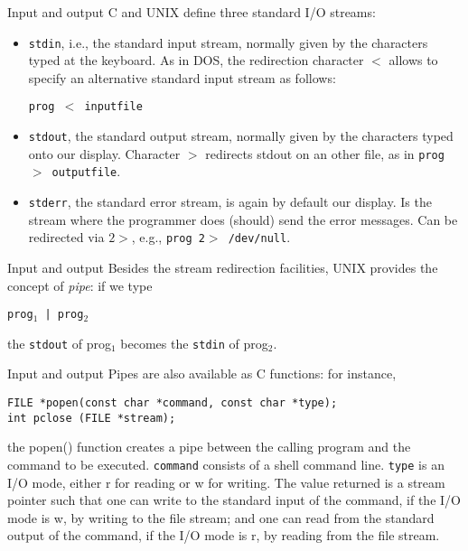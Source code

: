 \begin{frame}[fragile]{Input and output}
C and UNIX define three standard I/O streams:
\begin{itemize}
\item {\tt stdin}, i.e., the standard input stream,
normally given by the characters typed at the keyboard.
As in DOS, the redirection character $<$ allows to
specify an alternative standard input stream as follows:
\begin{center}\tt prog $<$ inputfile\end{center}
\item {\tt stdout}, the standard output stream, normally given by the characters
typed onto our display.
Character $>$ redirects stdout on an other file, as in
{\tt prog $>$ outputfile}.
\item {\tt stderr}, the standard error stream, is again by default
our display. Is the stream where the programmer does (should) send
the error messages. Can be redirected via  $2>$, e.g.,
{\tt prog 2$>$ /dev/null}.
\end{itemize}


\end{frame}
\begin{frame}[fragile]{Input and output}
Besides the stream redirection facilities, UNIX provides
the concept of  {\em pipe\/}: if we type
\begin{center}\tt prog${}_1$ | prog${}_2$\end{center}
the {\tt stdout} of prog${}_1$ becomes the {\tt stdin} of prog${}_2$.


\end{frame}
\begin{frame}[fragile]{Input and output}
Pipes are also available as C functions:
for instance, 
\begin{center}\tt FILE *popen(const char *command, const char *type);\\
int pclose (FILE *stream);
\end{center}
the popen() function creates a pipe between the calling program
and  the  command  to  be  executed.
\verb"command"
consists  of  a  shell  command  line.  \verb"type" is an I/O mode,
either r for reading or w for writing.  The  value  returned
is  a stream pointer such that one can write to the standard
input of the command, if the I/O mode is w,  by  writing  to
the  file  stream; and one can read from the
standard output of the command, if the I/O  mode  is  r,  by
reading  from  the  file  stream.


\end{frame}
